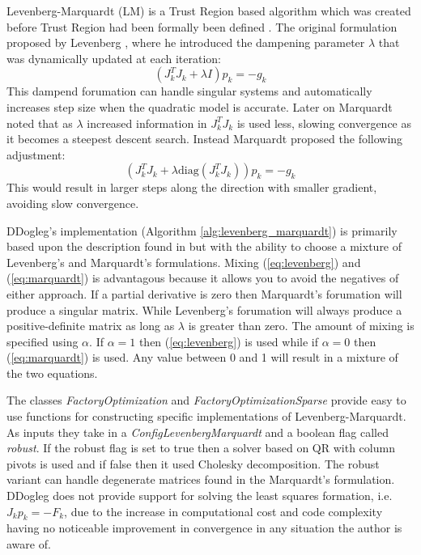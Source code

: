 \documentclass[peerreview,compsoc,onecolumn]{IEEEtran}
\begin{document}
Levenberg-Marquardt (LM) is a Trust Region based algorithm which was created before Trust Region had been formally been defined \cite{numopt2006,fletcher1987,dennis1996}. The original formulation proposed by Levenberg \cite{levenberg1944}, where he introduced the dampening parameter $\lambda$ that was dynamically updated at each iteration:
\begin{equation}
\label{eq:levenberg}
(J_k^T J_k + \lambda I) p_k = -g_k
\end{equation} 
This dampend forumation can handle singular systems and automatically increases step size when the quadratic model is accurate. Later on Marquardt \cite{marquardt1963} noted that as $\lambda$ increased information in $J_k^T J_k$ is used less, slowing convergence as it becomes a steepest descent search. Instead Marquardt proposed the following adjustment:
\begin{equation}
\label{eq:marquardt}
(J_k^T J_k + \lambda \mbox{diag}(J_k^T J_k)) p_k = -g_k
\end{equation} 
This would result in larger steps along the direction with smaller gradient, avoiding slow convergence.

DDogleg's implementation (Algorithm \ref{alg:levenberg_marquardt}) is primarily based upon the description found in \cite{IMM2004} but with the ability to choose a mixture of Levenberg's and Marquardt's formulations. Mixing (\ref{eq:levenberg}) and (\ref{eq:marquardt}) is advantagous because it allows you to avoid the negatives of either approach. If a partial derivative is zero then Marquardt's forumation will produce a singular matrix. While Levenberg's forumation will always produce a positive-definite matrix as long as $\lambda$ is greater than zero. The amount of mixing is specified using $\alpha$. If $\alpha=1$ then (\ref{eq:levenberg}) is used while if $\alpha=0$ then (\ref{eq:marquardt}) is used. Any value between 0 and 1 will result in a mixture of the two equations.

The classes \emph{FactoryOptimization} and \emph{FactoryOptimizationSparse} provide easy to use functions for constructing specific implementations of Levenberg-Marquardt. As inputs they take in a \emph{ConfigLevenbergMarquardt} and a boolean flag called \emph{robust}. If the robust flag is set to true then a solver based on QR with column pivots is used and if false then it used Cholesky decomposition. The robust variant can handle degenerate matrices found in the Marquardt's formulation. DDogleg does not provide support for solving the least squares formation, i.e. $J_k p_k = -F_k$, due to the increase in computational cost and code complexity having no noticeable improvement in convergence in any situation the author is aware of.
\end{document}
